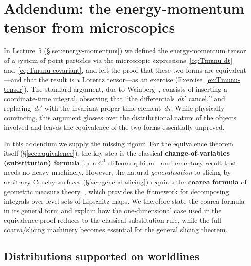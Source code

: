 
\section{Addendum: the energy-momentum tensor from microscopics}%
\label{sec:emt-rigorous}

In Lecture~6 (\S\ref{sec:energy-momentum}) we defined the
energy-momentum tensor of a system of point particles via the
microscopic expressions~\eqref{eq:Tmunu-dt}
and~\eqref{eq:Tmunu-covariant}, and left the proof that these two
forms are equivalent---and that the result is a Lorentz tensor---as
an exercise (Exercise~\ref{ex:Tmunu-tensor}).  The standard argument,
due to Weinberg~\cite{Weinberg72}, consists of inserting a
coordinate-time integral, observing that ``the differentials~$dt'$
cancel,'' and replacing~$dt'$ with the invariant proper-time
element~$d\tau$.  While physically convincing, this argument glosses
over the distributional nature of the objects involved and leaves the
equivalence of the two forms essentially unproved.

In this addendum we supply the missing rigour.  For the equivalence
theorem itself (\S\ref{sec:equivalence}), the key step is the
classical \textbf{change-of-variables (substitution) formula} for a
$C^1$ diffeomorphism---an elementary result that needs no heavy
machinery.  However, the natural \emph{generalisation} to slicing by
arbitrary Cauchy surfaces (\S\ref{sec:general-slicing}) requires the
\textbf{coarea formula} of geometric measure
theory~\cite{Federer69}, which provides the framework for
decomposing integrals over level sets of Lipschitz maps.
We therefore state the coarea formula in its general form and explain
how the one-dimensional case used in the equivalence proof reduces to
the classical substitution rule, while the full coarea/slicing
machinery becomes essential for the general slicing theorem.

\subsection{Distributions supported on worldlines}%
\label{sec:dist-worldlines}

